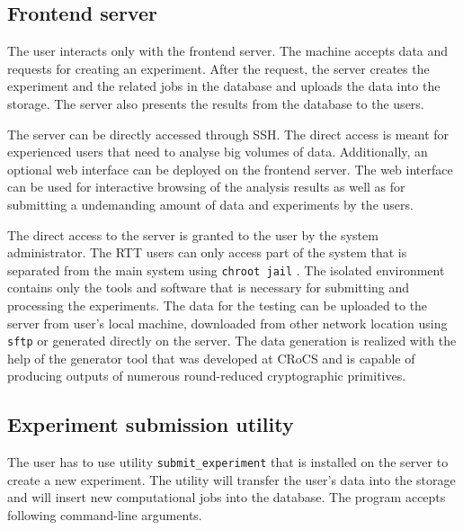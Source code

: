 \documentclass[
	digital,    %
	oneside,    %
	color,
	11pt,
	nocover,
	notable,
	nolof,
	nolot,
]{fithesis3}
\theoremstyle{definition}
\theoremstyle{remark}
\begin{document}
\subsection{Frontend server}
The user interacts only with the frontend server. The machine accepts data and requests for creating an experiment. After the request, the server creates the experiment and the related jobs in the database and uploads the data into the storage. The server also presents the results from the database to the users.

The server can be directly accessed through SSH. The direct access is meant for experienced users that need to analyse big volumes of data. Additionally, an optional web interface can be deployed on the frontend server. The web interface can be used for interactive browsing of the analysis results as well as for submitting a undemanding amount of data and experiments by the users.

The direct access to the server is granted to the user by the system administrator. The RTT users can only access part of the system that is separated from the main system using \texttt{chroot jail} \cite{chroot}. The isolated environment contains only the tools and software that is necessary for submitting and processing the experiments. The data for the testing can be uploaded to the server from user's local machine, downloaded from other network location using \texttt{sftp} or generated directly on the server. The data generation is realized with the help of the generator tool \cite{eacirc-streams} that was developed at CRoCS and is capable of producing outputs of numerous round-reduced cryptographic primitives.

\subsection*{Experiment submission utility}

The user has to use utility \texttt{submit\_experiment} that is installed on the server to create a new experiment. The utility will transfer the user's data into the storage and will insert new computational jobs into the database. The program accepts following command-line arguments.
\end{document}

